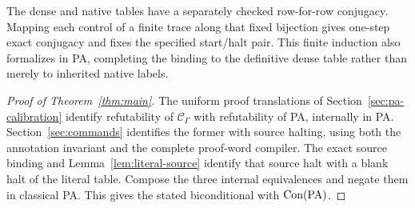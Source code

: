 The dense and native tables have a separately checked row-for-row conjugacy.
Mapping each control of a finite trace along that fixed bijection gives
one-step exact conjugacy and fixes the specified start/halt pair. This
finite induction also formalizes in PA, completing the binding to the
definitive dense table rather than merely to inherited native labels.

\begin{proof}[Proof of Theorem~\ref{thm:main}]
The uniform proof translations of Section~\ref{sec:pa-calibration} identify
refutability of $\mathcal C_\Gamma$ with refutability of PA, internally
in PA. Section~\ref{sec:commands} identifies the former with source
halting, using both the annotation invariant and the complete proof-word
compiler. The exact source binding and Lemma~\ref{lem:literal-source}
identify that source halt with a blank halt of the literal table. Compose
the three internal equivalences and negate them in classical PA. This
gives the stated biconditional with $\operatorname{Con}(\mathrm{PA})$.
\end{proof}
